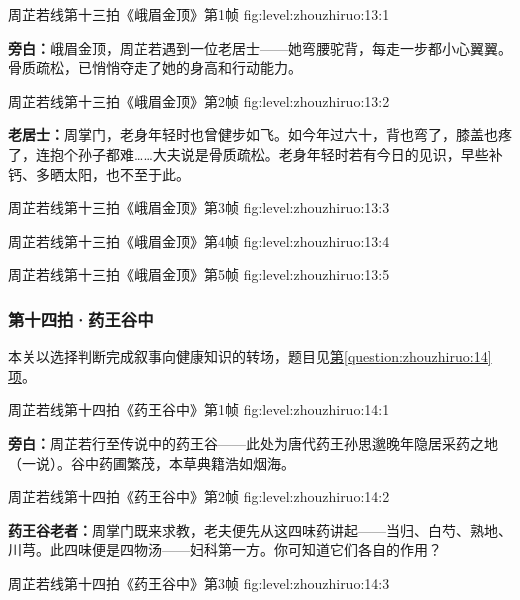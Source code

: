   {周芷若线第十三拍《峨眉金顶》第1帧}
  {fig:level:zhouzhiruo:13:1}
  {\scriptsize}
  {\textbf{旁白：}峨眉金顶，周芷若遇到一位老居士——她弯腰驼背，每走一步都小心翼翼。骨质疏松，已悄悄夺走了她的身高和行动能力。\par}

  {周芷若线第十三拍《峨眉金顶》第2帧}
  {fig:level:zhouzhiruo:13:2}
  {\scriptsize}
  {\textbf{老居士：}周掌门，老身年轻时也曾健步如飞。如今年过六十，背也弯了，膝盖也疼了，连抱个孙子都难……大夫说是骨质疏松。老身年轻时若有今日的见识，早些补钙、多晒太阳，也不至于此。\par}

  {周芷若线第十三拍《峨眉金顶》第3帧}
  {fig:level:zhouzhiruo:13:3}
  {\scriptsize}
  {\mbox{}}

\clearpage

  {周芷若线第十三拍《峨眉金顶》第4帧}
  {fig:level:zhouzhiruo:13:4}
  {\scriptsize}
  {\mbox{}}

  {周芷若线第十三拍《峨眉金顶》第5帧}
  {fig:level:zhouzhiruo:13:5}
  {\scriptsize}
  {\mbox{}}

\subsubsection{第十四拍·药王谷中}\label{plot:zhouzhiruo:14}
本关以选择判断完成叙事向健康知识的转场，题目见\hyperref[question:zhouzhiruo:14]{第\ref*{question:zhouzhiruo:14}项}。

  {周芷若线第十四拍《药王谷中》第1帧}
  {fig:level:zhouzhiruo:14:1}
  {\scriptsize}
  {\textbf{旁白：}周芷若行至传说中的药王谷——此处为唐代药王孙思邈晚年隐居采药之地（一说）。谷中药圃繁茂，本草典籍浩如烟海。\par}

\clearpage

  {周芷若线第十四拍《药王谷中》第2帧}
  {fig:level:zhouzhiruo:14:2}
  {\scriptsize}
  {\textbf{药王谷老者：}周掌门既来求教，老夫便先从这四味药讲起——当归、白芍、熟地、川芎。此四味便是四物汤——妇科第一方。你可知道它们各自的作用？\par}

  {周芷若线第十四拍《药王谷中》第3帧}
  {fig:level:zhouzhiruo:14:3}
  {\scriptsize}
  {\mbox{}}

